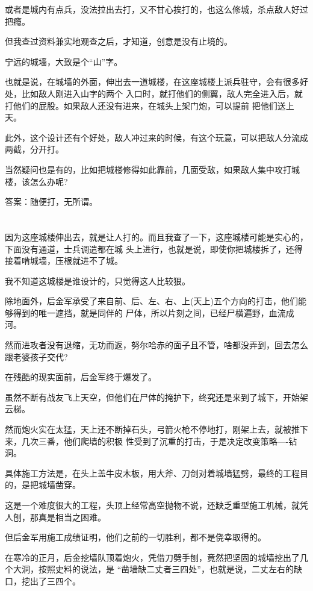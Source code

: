 \documentclass[11pt,a4paper,onecolumn]{article}
\begin{document}
或者是城内有点兵，没法拉出去打，又不甘心挨打的，也这么修城，杀点敌人好过把瘾。

但我查过资料兼实地观查之后，才知道，创意是没有止境的。

宁远的城墙，大致是个``山''字。

也就是说，在城墙的外面，伸出去一道城楼，在这座城楼上派兵驻守，会有很多好处，比如敌人刚进入山字的两个
入口时，就打他们的侧翼，敌人完全进入后，就打他们的屁股。如果敌人还没有进来，在城头上架门炮，可以提前
把他们送上天。

此外，这个设计还有个好处，敌人冲过来的时候，有这个玩意，可以把敌人分流成两截，分开打。

当然疑问也是有的，比如把城楼修得如此靠前，几面受敌，如果敌人集中攻打城楼，该怎么办呢?

答案：随便打，无所谓。

\section[\thesection]{}

因为这座城楼伸出去，就是让人打的。而且我查了一下，这座城楼可能是实心的，下面没有通道，士兵调遣都在城
头上进行，也就是说，即使你把城楼拆了，还得接着啃城墙，压根就进不了城。

我不知道这城楼是谁设计的，只觉得这人比较狠。

除地面外，后金军承受了来自前、后、左、右、上(天上)五个方向的打击，他们能够得到的唯一遮挡，就是同伴的
尸体，所以片刻之间，已经尸横遍野，血流成河。

然而进攻者没有退缩，无功而返，努尔哈赤的面子且不管，啥都没弄到，回去怎么跟老婆孩子交代?

在残酷的现实面前，后金军终于爆发了。

虽然不断有战友飞上天空，但他们在尸体的掩护下，终究还是来到了城下，开始架云梯。

然而炮火实在太猛，天上还不断掉石头，弓箭火枪不停地打，刚架上去，就被推下来，几次三番，他们爬墙的积极
性受到了沉重的打击，于是决定改变策略----钻洞。

具体施工方法是，在头上盖牛皮木板，用大斧、刀剑对着城墙猛劈，最终的工程目的，是把城墙凿穿。

这是一个难度很大的工程，头顶上经常高空抛物不说，还缺乏重型施工机械，就凭人刨，那真是相当之困难。

但后金军用施工成绩证明，他们之前的一切胜利，都不是侥幸取得的。

在寒冷的正月，后金挖墙队顶着炮火，凭借刀劈手刨，竟然把坚固的城墙挖出了几个大洞，按照史料的说法，是
``凿墙缺二丈者三四处''，也就是说，二丈左右的缺口，挖出了三四个。
\end{document}
